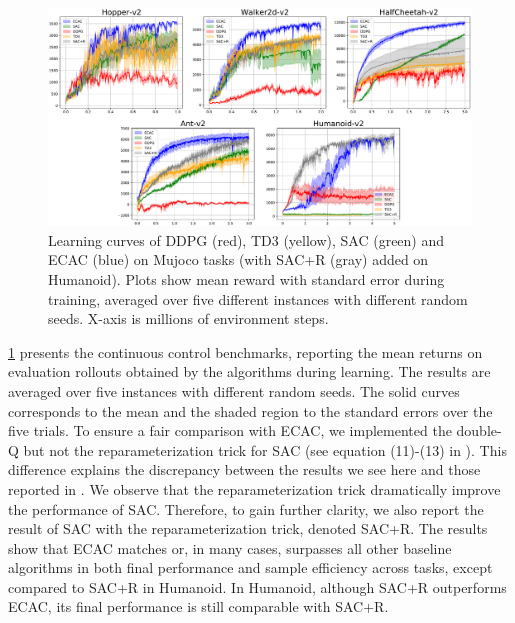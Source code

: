 \begin{figure}[t]
\begin{center}
\includegraphics[width=0.7\linewidth]{./mujoco-results.pdf}
\end{center}
\caption{
Learning curves of DDPG (red), TD3 (yellow), SAC (green) and ECAC (blue) on
Mujoco tasks (with SAC+R (gray) added on Humanoid).
Plots show mean reward with standard error during training,
averaged over five different instances with different random seeds.
X-axis is millions of environment steps.
}
\label{fig:result-mujoco} 
\end{figure}

\cref{fig:result-mujoco} presents the 
continuous control benchmarks, reporting the mean returns
on evaluation rollouts obtained by the algorithms during learning.
The
results are averaged over five instances
with different random seeds.
The solid curves corresponds to the mean and the shaded region to the
standard errors over the five trials.
To ensure a fair comparison with ECAC, we implemented the double-Q
but not the reparameterization trick for SAC 
(see equation (11)-(13) in \citep{haarnoja2018soft}).
This difference explains the discrepancy between the results we see here
and those reported in \citep{haarnoja2018soft}.
\fi
We observe that the reparameterization trick dramatically improve the performance of SAC. 
Therefore, to gain further clarity, 
we also report the result of SAC with the reparameterization trick,
denoted SAC+R.
The results show that ECAC matches or, in many cases, surpasses all other
baseline algorithms in both final performance and sample efficiency across
tasks, except compared to SAC+R in Humanoid.
In Humanoid, although SAC+R outperforms ECAC,
its final performance is still comparable with SAC+R.

